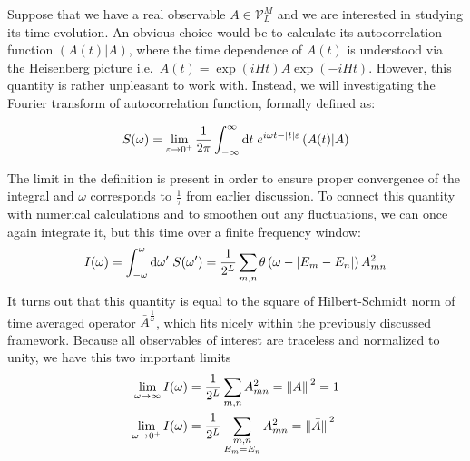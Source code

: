 Suppose that we have a real observable \(A \in \mathcal{V}_L^M\) and we are interested in studying its time
evolution. An obvious choice would be to calculate its autocorrelation function
\((A(t)|A)\), where the time dependence of \(A(t)\) is understood
via the Heisenberg picture i.e.\ \(A(t) = \exp\left(i H t\right) A
\exp\left(-i H t\right)\). However, this quantity is rather unpleasant to work with.
Instead, we will investigating the Fourier transform of autocorrelation function, formally
defined as:
\begin{definition}  
  \begin{equation*}
  S(\omega) =  \lim _{\varepsilon \to 0^+} \frac{1}{2 \pi} \int_{-\infty}^{\infty} \mathrm{d} t 
  \; e^{i \omega t-|t| \varepsilon}\left(A(t) \middle| A\right)
  \end{equation*}
  \label{def:spectral function}
\end{definition}
The limit in the definition is present in order to ensure proper convergence of the integral
and \(\omega{}\) corresponds to \(\frac{1}{\tau}\) from earlier discussion.
To connect this quantity with numerical calculations and to smoothen out any fluctuations, we
can once again integrate it, but this time over a finite frequency window:
\begin{equation}
  I(\omega) = \int_{-\omega}^{\omega} \mathrm{d}\omega^{\prime} \; S(\omega^{\prime}) = 
  \frac{1}{2^L} \sum_{m,n} \theta\left(\omega - |E_m-E_n|\right) A_{mn}^2
  \label{eq:integrated spectral function}
\end{equation}
It turns out that this quantity is equal to the square of Hilbert-Schmidt norm of time
averaged operator \(\bar{A}^{\frac{1}{\omega}}\), which fits nicely within the previously
discussed framework. Because all observables of interest are traceless and
normalized to unity, we have this two important limits
\begin{align}
  \lim_{\omega \to \infty } I(\omega) &= \frac{1}{2^L}\sum_{m,n} A_{mn}^2 = \norm*{A}^2 = 1\\
  \lim_{\omega \to 0^+ } I(\omega) &= \frac{1}{2^L} \sum_{ \substack{m,n\\E_m=E_n} } A_{mn}^2 = \norm*{\bar{A}}^2
\end{align}

